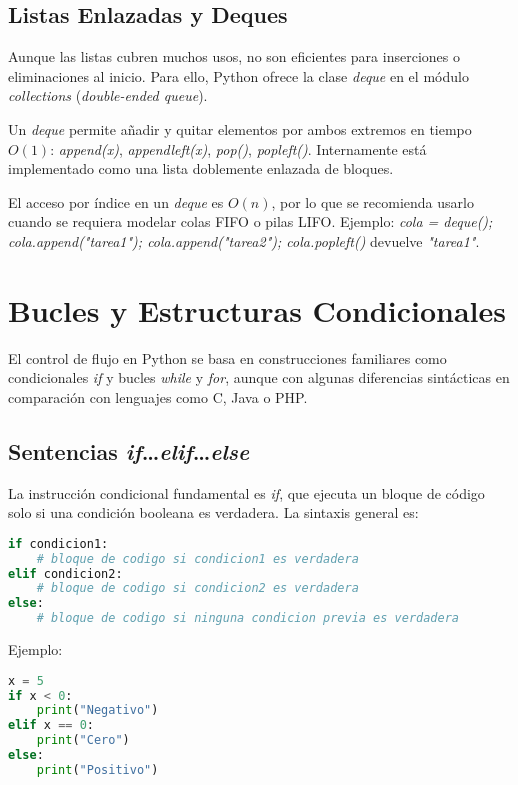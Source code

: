 \subsection*{Listas Enlazadas y Deques}
Aunque las listas cubren muchos usos, no son eficientes para inserciones o eliminaciones al inicio.  
Para ello, Python ofrece la clase \textit{deque} en el módulo \textit{collections} 
(\textit{double-ended queue}).  

Un \textit{deque} permite añadir y quitar elementos por ambos extremos en tiempo $O(1)$:  
\textit{append(x)}, \textit{appendleft(x)}, \textit{pop()}, \textit{popleft()}.  
Internamente está implementado como una lista doblemente enlazada de bloques.  

El acceso por índice en un \textit{deque} es $O(n)$, por lo que se recomienda usarlo 
cuando se requiera modelar colas FIFO o pilas LIFO.  
Ejemplo:  
\textit{cola = deque(); cola.append("tarea1"); cola.append("tarea2"); cola.popleft()} 
devuelve \textit{"tarea1"}.  

\section{Bucles y Estructuras Condicionales}

El control de flujo en Python se basa en construcciones familiares como 
condicionales \textit{if} y bucles \textit{while} y \textit{for}, 
aunque con algunas diferencias sintácticas en comparación con lenguajes como 
C, Java o PHP.

\subsection*{Sentencias \textit{if}…\textit{elif}…\textit{else}}

La instrucción condicional fundamental es \textit{if}, que ejecuta un bloque de código 
solo si una condición booleana es verdadera. La sintaxis general es:

\begin{lstlisting}[language=Python, caption={Estructura condicional en Python.}]
if condicion1:
    # bloque de codigo si condicion1 es verdadera
elif condicion2:
    # bloque de codigo si condicion2 es verdadera
else:
    # bloque de codigo si ninguna condicion previa es verdadera
\end{lstlisting}

Ejemplo:

\begin{lstlisting}[language=Python, caption={Ejemplo de uso de if-elif-else.}]
x = 5
if x < 0:
    print("Negativo")
elif x == 0:
    print("Cero")
else:
    print("Positivo")
\end{lstlisting}


